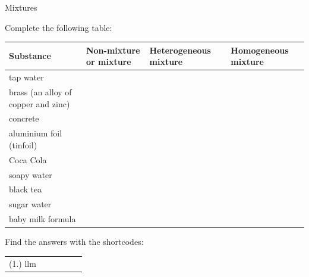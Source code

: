 \label{m38708*secfhsst!!!underscore!!!id169}
\begin{exercises}{Mixtures}
{Complete the following table: \\
\begin{tabular}{|l|p{2.5cm}|p{2.5cm}|p{2.5cm}|}\hline
\textbf{Substance} & \textbf{Non-mixture or mixture} & \textbf{Heterogeneous mixture} & \textbf{Homogeneous mixture} \\ \hline
tap water & & & \\ \hline
brass (an alloy of copper and zinc) & & & \\ \hline
concrete & & & \\ \hline
aluminium foil (tinfoil) & & & \\ \hline
Coca Cola & & & \\ \hline
soapy water & & & \\ \hline
black tea & & & \\ \hline
sugar water & & & \\ \hline
baby milk formula & & & \\ \hline
\end{tabular}
\practiceinfo
    \label{m38708*cid3}
\par {} Find the answers with the shortcodes:
 \par \begin{tabular}[h]{cccccc}
 (1.) llm  & \end{tabular} }
\end{exercises}
